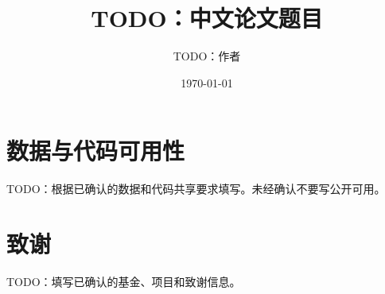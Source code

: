 \documentclass[UTF8,a4paper,zihao=-4]{ctexart}
\title{TODO：中文论文题目}
\author{TODO：作者}
\date{\today}
\begin{document}
\maketitle








\section*{数据与代码可用性}
TODO：根据已确认的数据和代码共享要求填写。未经确认不要写公开可用。

\section*{致谢}
TODO：填写已确认的基金、项目和致谢信息。

% 
% 
\end{document}
